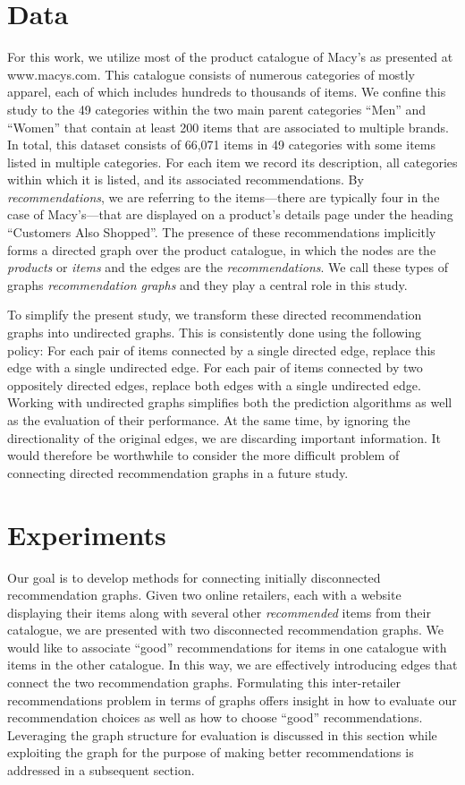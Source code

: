 \documentclass[11pt]{article}
\begin{document}
\section*{Data}
For this work, we utilize most of the product catalogue of Macy's as presented
at www.macys.com. This catalogue consists of numerous categories of mostly
apparel, each of which includes hundreds to thousands of items. We confine this
study to the 49 categories within the two main parent categories ``Men'' and
``Women'' that contain at least 200 items that are associated to multiple
brands. In total, this dataset consists of 66,071 items in 49 categories with
some items listed in multiple categories. For each item we record its
description, all categories within which it is listed, and its associated
recommendations. By {\em recommendations}, we are referring to the items---there
are typically four in the case of Macy's---that are displayed on a product's
details page under the heading ``Customers Also Shopped''. The presence of these
recommendations implicitly forms a directed graph over the product catalogue, in
which the nodes are the {\em products} or {\em items} and the edges are the {\em
recommendations}. We call these types of graphs {\em recommendation graphs} and
they play a central role in this study.

To simplify the present study, we transform these directed recommendation graphs
into undirected graphs. This is consistently done using the following policy:
For each pair of items connected by a single directed edge, replace this edge
with a single undirected edge. For each pair of items connected by two
oppositely directed edges, replace both edges with a single undirected edge.
Working with undirected graphs simplifies both the prediction algorithms as well
as the evaluation of their performance. At the same time, by ignoring the
directionality of the original edges, we are discarding important information.
It would therefore be worthwhile to consider the more difficult problem of
connecting directed recommendation graphs in a future study.

\section*{Experiments}
Our goal is to develop methods for connecting initially disconnected
recommendation graphs. Given two online retailers, each with a website
displaying their items along with several other {\em recommended} items from
their catalogue, we are presented with two disconnected recommendation graphs.
We would like to associate ``good'' recommendations for items in one catalogue
with items in the other catalogue. In this way, we are effectively introducing
edges that connect the two recommendation graphs. Formulating this
inter-retailer recommendations problem in terms of graphs offers insight in how
to evaluate our recommendation choices as well as how to choose ``good''
recommendations.  Leveraging the graph structure for evaluation is discussed in
this section while exploiting the graph for the purpose of making better
recommendations is addressed in a subsequent section.
\end{document}
